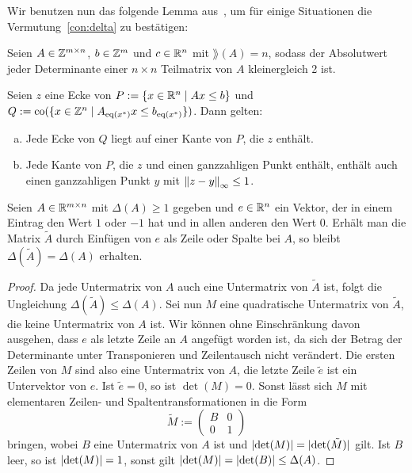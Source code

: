 Wir benutzen nun das folgende Lemma aus~\cite[Theorem 2 und Beweis]{VESELOV2009220}, um für einige Situationen die Vermutung~\ref{con:delta} zu bestätigen:
\begin{lemma}\label{lem:veselov}
	Seien $A\in\mathbb{Z}^{m\times n}$, $b\in\mathbb{Z}^m$ und $c\in\mathbb{R}^n$ mit $\rang(A)=n$, sodass der Absolutwert jeder Determinante einer $n\times n$ Teilmatrix von $A$ kleinergleich 2 ist.
	
	Seien $z$ eine Ecke von $P:=\{x\in\mathbb{R}^n\mid Ax\leq b \}$ und $Q:=\operatorname{co}(\{x\in\mathbb{Z}^n \mid A_{\operatorname{eq}(x^*)}x \leq b_{\operatorname{eq}(x^*)} \})$.
	Dann gelten:
	\begin{enumerate}[(a)]
		\item Jede Ecke von $Q$ liegt auf einer Kante von $P$, die $z$ enthält.
		\item Jede Kante von $P$, die $z$ und einen ganzzahligen Punkt enthält, enthält auch einen ganzzahligen Punkt $y$ mit $\left\lVert z -y\right\rVert_\infty\leq 1$.
	\end{enumerate}
\end{lemma}
\begin{lemma}\label{lem:same-delta}
	Seien $A\in\mathbb{R}^{m\times n}$ mit $\Delta(A)\geq 1$ gegeben und $e\in\mathbb{R}^n$ ein Vektor, der in einem Eintrag den Wert $1$ oder $-1$ hat und in allen anderen den Wert $0$.
	Erhält man die Matrix $\tilde{A}$ durch Einfügen von $e$ als Zeile oder Spalte bei $A$, so bleibt $\Delta(\tilde{A})=\Delta(A)$ erhalten.
\end{lemma}
\begin{proof}
	Da jede Untermatrix von $A$ auch eine Untermatrix von $\tilde{A}$ ist, folgt die Ungleichung $\Delta(\tilde{A})\leq\Delta(A)$.
	Sei nun $M$ eine quadratische Untermatrix von $\tilde{A}$, die keine Untermatrix von $A$ ist.
	Wir können ohne Einschränkung davon ausgehen, dass $e$ als letzte Zeile an $A$ angefügt worden ist, da sich der Betrag der Determinante unter Transponieren und Zeilentausch nicht verändert.
	Die ersten Zeilen von $M$ sind also eine Untermatrix von $A$, die letzte Zeile $\tilde{e}$ ist ein Untervektor von $e$.
	Ist $\tilde{e}=0$, so ist $\det(M)=0$.
	Sonst lässt sich $M$ mit elementaren Zeilen- und Spaltentransformationen in die Form $$\tilde{M}:= \begin{pmatrix}
		B & 0 \\
		0 & 1
	\end{pmatrix}$$ bringen, wobei $B$ eine Untermatrix von $A$ ist und $\lvert \det(M) \rvert=\lvert \det(\tilde{M}) \rvert$ gilt.
	Ist $B$ leer, so ist $\lvert \det(M) \rvert=1$, sonst gilt $\lvert \det(M) \rvert=\lvert \det(B) \rvert\leq\Delta(A)$.
\end{proof}

